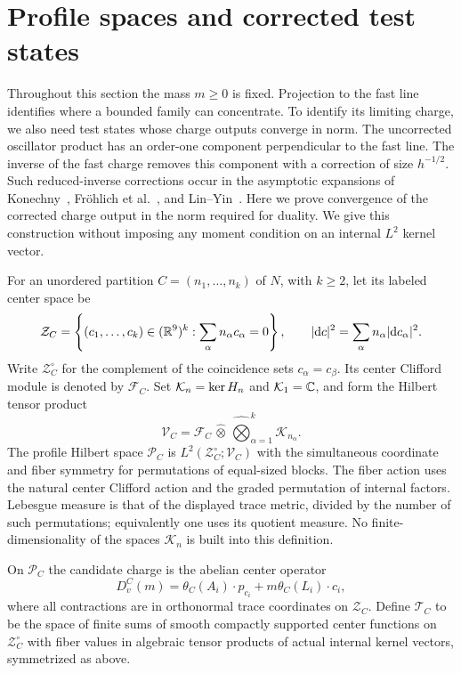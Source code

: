 \section{Profile spaces and corrected test states}
\label{lift:section}

Throughout this section the mass $m\geq0$ is fixed. Projection to the
fast line identifies where a bounded family can concentrate. To identify
its limiting charge, we also need test states
whose charge outputs converge in norm. The uncorrected oscillator
product has an order-one component perpendicular to the fast line.
The inverse of the fast charge removes this component with a correction
of size $h^{-1/2}$. Such reduced-inverse corrections occur in the
asymptotic expansions of Konechny~\cite{Konechny1999},
Fr\"ohlich et al.~\cite{FroehlichEtAl2000}, and
Lin--Yin~\cite[Section~4.1]{LinYin2015}. Here we prove convergence of
the corrected charge output in the norm required for duality. We give this construction without imposing any
moment condition on an internal $L^2$ kernel vector.

\begin{definition}\label{def:profile-space}
For an unordered partition $C=(n_1,\ldots,n_k)$ of $N$, with $k\geq2$,
let its labeled center space be
\[
 \mathcal Z_C=\left\{(c_1,\ldots,c_k)\in(\mathbb R^9)^k:
                         \sum_\alpha n_\alpha c_\alpha=0\right\},
 \qquad
 |\mathrm d c|^2=\sum_\alpha n_\alpha|\mathrm d c_\alpha|^2.
\]
Write $\mathcal Z_C^\circ$ for the complement of the coincidence
sets $c_\alpha=c_\beta$. Its center Clifford module is denoted by
$\mathcal F_C$. Set $\mathcal K_n=\operatorname{ker} H_n$ and
$\mathcal K_1=\mathbb C$, and form the Hilbert tensor product
\[
 \mathcal V_C=\mathcal F_C\,\widehat\otimes\,
                        \widehat\bigotimes_{\alpha=1}^k\mathcal K_{n_\alpha}.
\]
The profile Hilbert space $\mathcal P_C$ is
$L^2(\mathcal Z_C^\circ;\mathcal V_C)$ with the simultaneous
coordinate and fiber symmetry for permutations of equal-sized blocks.
The fiber action uses the natural center Clifford action and the
graded permutation of internal factors. Lebesgue measure is that of
the displayed trace metric, divided by the number of such
permutations; equivalently one uses its quotient measure. No
finite-dimensionality of the spaces $\mathcal K_n$ is built into
this definition.

On $\mathcal P_C$ the candidate charge is the abelian center operator
\begin{equation}
 D_v^C(m)=\theta_C(A_i)\cdot p_{c_i}
                          +m\theta_C(L_i)\cdot c_i,
 \label{lift:center-charge}
\end{equation}
where all contractions are in orthonormal trace coordinates on
$\mathcal Z_C$. Define $\mathcal T_C$ to be the space of finite sums
of smooth compactly supported center functions on
$\mathcal Z_C^\circ$ with fiber values in algebraic tensor products
of actual internal kernel vectors, symmetrized as above.
\end{definition}

